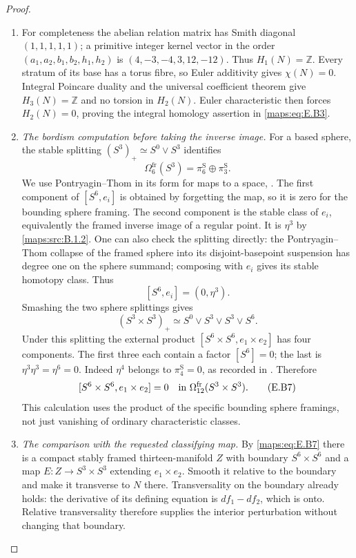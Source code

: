 \begin{proof}
\begin{enumerate}[label=\arabic*.,leftmargin=*]
\item For completeness the abelian relation matrix has Smith
diagonal $(1,1,1,1,1)$; a primitive integer kernel vector in
the order $(a_1,a_2,b_1,b_2,h_1,h_2)$ is
$(4,-3,-4,3,12,-12)$. Thus $H_1(N)=\mathbb Z$.
Every stratum of its base has a torus fibre, so Euler
additivity gives $\chi(N)=0$. Integral Poincare duality and
the universal coefficient theorem give $H_3(N)=\mathbb Z$
and no torsion in $H_2(N)$. Euler characteristic then forces
$H_2(N)=0$, proving the integral homology assertion in \eqref{maps:eq:E.B3}.

\item \emph{The bordism computation before taking the inverse image.}
For a based sphere, the stable splitting
$(S^3)_+\simeq S^0\vee S^3$ identifies
\[
 \Omega^{\mathrm{fr}}_6(S^3)
       =\pi^{\mathrm S}_6\oplus\pi^{\mathrm S}_3.
 \tag{E.B6}\label{maps:eq:E.B6}
\]
We use Pontryagin--Thom in its form for maps to a space,
\cite[Definition 8.16 and Theorem 8.17]{rootDavisKirk01}.
The first component of $[S^6,e_i]$ is obtained by forgetting
the map, so it is zero for the bounding sphere framing.
The second component is the stable class of $e_i$, equivalently
the framed inverse image of a regular point. It is $\eta^3$
by \ref{maps:src:B.1.2}. One can also check the splitting directly: the
Pontryagin--Thom collapse of the framed sphere into its
disjoint-basepoint suspension has degree one on the sphere
summand; composing with $e_i$ gives its stable homotopy class.
Thus
\[
                         [S^6,e_i]=(0,\eta^3).
\]
Smashing the two sphere splittings gives
\[
 (S^3\times S^3)_+\simeq
       S^0\vee S^3\vee S^3\vee S^6.
\]
Under this splitting the external product
$[S^6\times S^6,e_1\times e_2]$ has four components.
The first three each contain a factor $[S^6]=0$; the last
is $\eta^3\eta^3=\eta^6=0$. Indeed $\eta^4$ belongs to
$\pi^{\mathrm S}_4=0$, as recorded in
\cite[Corollary~1.3 and Table~1, pp.~112--113]{IsaksenWangXu2023}. Therefore
\[
 [S^6\times S^6,e_1\times e_2]=0
      \quad\hbox{in }\Omega^{\mathrm{fr}}_{12}(S^3\times S^3).
 \tag{E.B7}\label{maps:eq:E.B7}
\]
This calculation uses the product of the specific bounding
sphere framings, not just vanishing of ordinary characteristic
classes.

\item \emph{The comparison with the requested classifying map.}
By \eqref{maps:eq:E.B7} there is a compact stably framed thirteen-manifold
$Z$ with boundary $S^6\times S^6$ and a map
$E:Z\to S^3\times S^3$ extending $e_1\times e_2$.
Smooth it relative to the boundary and make it transverse
to $N$ there. Transversality on the boundary already holds:
the derivative of its defining equation is $df_1-df_2$,
which is onto. Relative transversality therefore supplies
the interior perturbation without changing that boundary.


\end{enumerate}
\end{proof}
